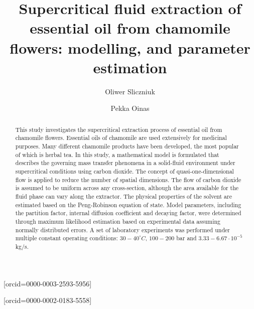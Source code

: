\documentclass[a4paper,fleqn]{cas-dc}
\begin{document}
 

\title[mode=title]{Supercritical fluid extraction of essential oil from chamomile flowers: modelling, and parameter estimation}                      


\author[1]{Oliwer Sliczniuk}[orcid=0000-0003-2593-5956]
\cormark[1]

\author[1]{Pekka Oinas}[orcid=0000-0002-0183-5558]

\address[1]{Aalto University, School of Chemical Engineering, Espoo, 02150, Finland}


\begin{abstract}
This study investigates the supercritical extraction process of essential oil from chamomile flowers. Essential oils of chamomile are used extensively for medicinal purposes. Many different chamomile products have been developed, the most popular of which is herbal tea. In this study, a mathematical model is formulated that describes the governing mass transfer phenomena in a solid-fluid environment under supercritical conditions using carbon dioxide. The concept of quasi-one-dimensional flow is applied to reduce the number of spatial dimensions. The flow of carbon dioxide is assumed to be uniform across any cross-section, although the area available for the fluid phase can vary along the extractor. The physical properties of the solvent are estimated based on the Peng-Robinson equation of state. Model parameters, including the partition factor, internal diffusion coefficient and decaying factor, were determined through maximum likelihood estimation based on experimental data assuming normally distributed errors. A set of laboratory experiments was performed under multiple constant operating conditions: $30-40^\circ C$, $100-200$ bar and $3.33-6.67 \cdot 10^{-5}$ kg/s.


\end{abstract}
\end{document}
